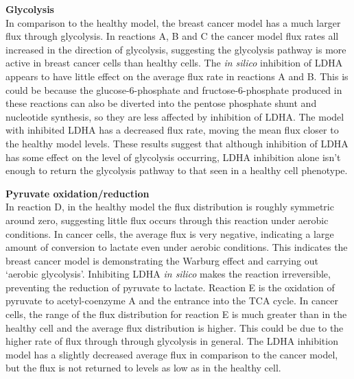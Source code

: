 \documentclass[10pt,letterpaper]{article}
\begin{document}
\textbf{Glycolysis} \\
In comparison to the healthy model, the breast cancer model has a much larger flux through glycolysis. In reactions A, B and C the cancer model flux rates all increased in the direction of glycolysis, suggesting the glycolysis pathway is more active in breast cancer cells than healthy cells. The \textit{in silico} inhibition of LDHA appears to have little effect on the average flux rate in reactions A and B. This is could be because the glucose-6-phosphate and fructose-6-phosphate produced in these reactions can also be diverted into the pentose phosphate shunt and nucleotide synthesis, so they are less affected by inhibition of LDHA. The model with inhibited LDHA has a decreased flux rate, moving the mean flux closer to the healthy model levels. These results suggest that although inhibition of LDHA has some effect on the level of glycolysis occurring, LDHA inhibition alone isn’t enough to return the glycolysis pathway to that seen in a healthy cell phenotype.

\textbf{Pyruvate oxidation/reduction} \\
In reaction D, in the healthy model the flux distribution is roughly symmetric around zero, suggesting little flux occurs through this reaction under aerobic conditions. In cancer cells, the average flux is very negative, indicating a large amount of conversion to lactate even under aerobic conditions. This indicates the breast cancer model is demonstrating the Warburg effect and carrying out ‘aerobic glycolysis’. Inhibiting LDHA \textit{in silico} makes the reaction irreversible, preventing the reduction of pyruvate to lactate. Reaction E is the oxidation of pyruvate to acetyl-coenzyme A and the entrance into the TCA cycle. In cancer cells, the range of the flux distribution for reaction E is much greater than in the healthy cell and the average flux distribution is higher. This could be due to the higher rate of flux through through glycolysis in general. The LDHA inhibition model has a slightly decreased average flux in comparison to the cancer model, but the flux is not returned to levels as low as in the healthy cell. 
\end{document}
